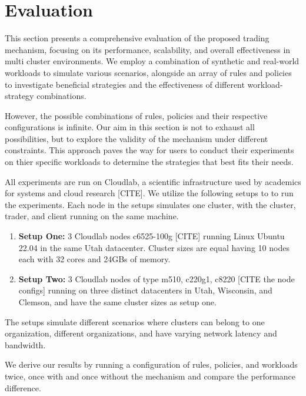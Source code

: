 \chapter{Evaluation}

This section presents a comprehensive evaluation of the proposed trading
mechanism, focusing on its performance, scalability, and overall effectiveness
in multi cluster environments. We employ a combination of synthetic and
real-world workloads to simulate various scenarios, alongside an array of rules
and policies to investigate beneficial strategies and the effectiveness of
different workload-strategy combinations.

However, the possible combinations of rules, policies and their respective
configurations is infinite. Our aim in this section is not to exhaust all
possibilities, but to explore the validity of the mechanism under different
constraints. This approach paves the way for users to conduct their experiments
on thier specific workloads to determine the strategies that best fits their
needs.  

All experiments are run on Cloudlab, a scientific infrastructure used by
academics for systems and cloud research [CITE]. We utilize the following
setups to to run the experiments. Each node in the setups simulates one
cluster, with the cluster, trader, and client running on the same machine. 

\begin{enumerate}

  \item \textbf{Setup One:} 3 Cloudlab nodes c6525-100g [CITE] running Linux
    Ubuntu 22.04 in the same Utah datacenter. Cluster sizes are equal having 10
    nodes each with 32 cores and 24GBs of memory.

  \item \textbf{Setup Two:} 3 Cloudlab nodes of type m510, c220g1, c8220 [CITE
    the node configs] running on three distinct datacenters in Utah, Wisconsin,
    and Clemson, and have the same cluster sizes as setup one.

\end{enumerate}

The setups simulate different scenarios where clusters can belong to one
organization, different organizations, and have varying network latency and
bandwidth.  

We derive our results by running a configuration of rules, policies, and
workloads twice, once with and once without the mechanism and compare the
performance difference.

